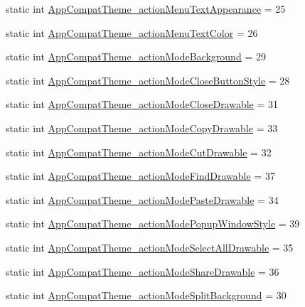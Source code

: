 \begin{DoxyCompactItemize}
\item 
static int \hyperlink{classandroid_1_1support_1_1v4_1_1R_1_1styleable_a8d4a63cac0fa21d43ff5e5b99a180331}{App\+Compat\+Theme\+\_\+action\+Menu\+Text\+Appearance} = 25
\item 
static int \hyperlink{classandroid_1_1support_1_1v4_1_1R_1_1styleable_a42c5c79dac7e9099ffa7eec510614d9f}{App\+Compat\+Theme\+\_\+action\+Menu\+Text\+Color} = 26
\item 
static int \hyperlink{classandroid_1_1support_1_1v4_1_1R_1_1styleable_afefcbfb79f6f036571910bdb524294fe}{App\+Compat\+Theme\+\_\+action\+Mode\+Background} = 29
\item 
static int \hyperlink{classandroid_1_1support_1_1v4_1_1R_1_1styleable_a663f6400e9039cc3de0b0a345cc307d9}{App\+Compat\+Theme\+\_\+action\+Mode\+Close\+Button\+Style} = 28
\item 
static int \hyperlink{classandroid_1_1support_1_1v4_1_1R_1_1styleable_a235b884d67d38c23c9ce1e69aa79c7cc}{App\+Compat\+Theme\+\_\+action\+Mode\+Close\+Drawable} = 31
\item 
static int \hyperlink{classandroid_1_1support_1_1v4_1_1R_1_1styleable_a50471ef5cb2699d49ac3b144a6fbb0b4}{App\+Compat\+Theme\+\_\+action\+Mode\+Copy\+Drawable} = 33
\item 
static int \hyperlink{classandroid_1_1support_1_1v4_1_1R_1_1styleable_abe3095e21e91f61195e7e499bed38e0e}{App\+Compat\+Theme\+\_\+action\+Mode\+Cut\+Drawable} = 32
\item 
static int \hyperlink{classandroid_1_1support_1_1v4_1_1R_1_1styleable_aed5000c3e758ba19503acb4620d9059b}{App\+Compat\+Theme\+\_\+action\+Mode\+Find\+Drawable} = 37
\item 
static int \hyperlink{classandroid_1_1support_1_1v4_1_1R_1_1styleable_aa4e5a97fc5aefa3e9414a786423d1a6f}{App\+Compat\+Theme\+\_\+action\+Mode\+Paste\+Drawable} = 34
\item 
static int \hyperlink{classandroid_1_1support_1_1v4_1_1R_1_1styleable_ae15d1354af03ae1760e80c0083aed3b1}{App\+Compat\+Theme\+\_\+action\+Mode\+Popup\+Window\+Style} = 39
\item 
static int \hyperlink{classandroid_1_1support_1_1v4_1_1R_1_1styleable_a74c31f8d65fcd2a018041d8588ae4fbc}{App\+Compat\+Theme\+\_\+action\+Mode\+Select\+All\+Drawable} = 35
\item 
static int \hyperlink{classandroid_1_1support_1_1v4_1_1R_1_1styleable_a88501ea40bddb326cfe337c4c21f7488}{App\+Compat\+Theme\+\_\+action\+Mode\+Share\+Drawable} = 36
\item 
static int \hyperlink{classandroid_1_1support_1_1v4_1_1R_1_1styleable_a3a8c8ba4a4bb7a3e1cb7b23f47caa2b1}{App\+Compat\+Theme\+\_\+action\+Mode\+Split\+Background} = 30

\end{DoxyCompactItemize}
